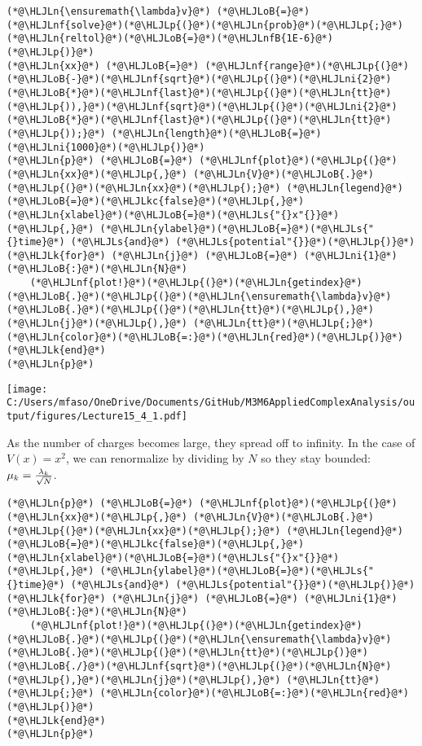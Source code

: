 \documentclass[12pt,landscape]{article}
\newcommand{\HLJLk}[1]{\textcolor[RGB]{148,91,176}{\textbf{#1}}}
\newcommand{\HLJLkc}[1]{\textcolor[RGB]{59,151,46}{\textit{#1}}}
\newcommand{\HLJLn}[1]{#1}
\newcommand{\HLJLnf}[1]{\textcolor[RGB]{66,102,213}{#1}}
\newcommand{\HLJLs}[1]{\textcolor[RGB]{201,61,57}{#1}}
\newcommand{\HLJLnfB}[1]{\textcolor[RGB]{59,151,46}{#1}}
\newcommand{\HLJLni}[1]{\textcolor[RGB]{59,151,46}{#1}}
\newcommand{\HLJLoB}[1]{\textcolor[RGB]{102,102,102}{\textbf{#1}}}
\newcommand{\HLJLp}[1]{#1}
\def\cent#1{\begin{center}#1\end{center} }
\begin{document}
{\begin{lstlisting}
(*@\HLJLn{\ensuremath{\lambda}v}@*) (*@\HLJLoB{=}@*) (*@\HLJLnf{solve}@*)(*@\HLJLp{(}@*)(*@\HLJLn{prob}@*)(*@\HLJLp{;}@*) (*@\HLJLn{reltol}@*)(*@\HLJLoB{=}@*)(*@\HLJLnfB{1E-6}@*)(*@\HLJLp{)}@*)
(*@\HLJLn{xx}@*) (*@\HLJLoB{=}@*) (*@\HLJLnf{range}@*)(*@\HLJLp{(}@*)(*@\HLJLoB{-}@*)(*@\HLJLnf{sqrt}@*)(*@\HLJLp{(}@*)(*@\HLJLni{2}@*)(*@\HLJLoB{*}@*)(*@\HLJLnf{last}@*)(*@\HLJLp{(}@*)(*@\HLJLn{tt}@*)(*@\HLJLp{)),}@*)(*@\HLJLnf{sqrt}@*)(*@\HLJLp{(}@*)(*@\HLJLni{2}@*)(*@\HLJLoB{*}@*)(*@\HLJLnf{last}@*)(*@\HLJLp{(}@*)(*@\HLJLn{tt}@*)(*@\HLJLp{));}@*) (*@\HLJLn{length}@*)(*@\HLJLoB{=}@*)(*@\HLJLni{1000}@*)(*@\HLJLp{)}@*)
(*@\HLJLn{p}@*) (*@\HLJLoB{=}@*) (*@\HLJLnf{plot}@*)(*@\HLJLp{(}@*)(*@\HLJLn{xx}@*)(*@\HLJLp{,}@*) (*@\HLJLn{V}@*)(*@\HLJLoB{.}@*)(*@\HLJLp{(}@*)(*@\HLJLn{xx}@*)(*@\HLJLp{);}@*) (*@\HLJLn{legend}@*)(*@\HLJLoB{=}@*)(*@\HLJLkc{false}@*)(*@\HLJLp{,}@*) (*@\HLJLn{xlabel}@*)(*@\HLJLoB{=}@*)(*@\HLJLs{"{}x"{}}@*)(*@\HLJLp{,}@*) (*@\HLJLn{ylabel}@*)(*@\HLJLoB{=}@*)(*@\HLJLs{"{}time}@*) (*@\HLJLs{and}@*) (*@\HLJLs{potential"{}}@*)(*@\HLJLp{)}@*)
(*@\HLJLk{for}@*) (*@\HLJLn{j}@*) (*@\HLJLoB{=}@*) (*@\HLJLni{1}@*)(*@\HLJLoB{:}@*)(*@\HLJLn{N}@*)
    (*@\HLJLnf{plot!}@*)(*@\HLJLp{(}@*)(*@\HLJLn{getindex}@*)(*@\HLJLoB{.}@*)(*@\HLJLp{(}@*)(*@\HLJLn{\ensuremath{\lambda}v}@*)(*@\HLJLoB{.}@*)(*@\HLJLp{(}@*)(*@\HLJLn{tt}@*)(*@\HLJLp{),}@*)(*@\HLJLn{j}@*)(*@\HLJLp{),}@*) (*@\HLJLn{tt}@*)(*@\HLJLp{;}@*) (*@\HLJLn{color}@*)(*@\HLJLoB{=:}@*)(*@\HLJLn{red}@*)(*@\HLJLp{)}@*)
(*@\HLJLk{end}@*)
(*@\HLJLn{p}@*)
\end{lstlisting}

\cent{\texttt{[image: C:/Users/mfaso/OneDrive/Documents/GitHub/M3M6AppliedComplexAnalysis/output/figures/Lecture15\_4\_1.pdf]}}

As the number of charges becomes large, they spread off to infinity. In the case of $V(x) = x^2$, we can renormalize by  dividing by $N$ so they stay bounded: $\mu_k = {\lambda_k \over \sqrt N}$.


\begin{lstlisting}
(*@\HLJLn{p}@*) (*@\HLJLoB{=}@*) (*@\HLJLnf{plot}@*)(*@\HLJLp{(}@*)(*@\HLJLn{xx}@*)(*@\HLJLp{,}@*) (*@\HLJLn{V}@*)(*@\HLJLoB{.}@*)(*@\HLJLp{(}@*)(*@\HLJLn{xx}@*)(*@\HLJLp{);}@*) (*@\HLJLn{legend}@*)(*@\HLJLoB{=}@*)(*@\HLJLkc{false}@*)(*@\HLJLp{,}@*) (*@\HLJLn{xlabel}@*)(*@\HLJLoB{=}@*)(*@\HLJLs{"{}x"{}}@*)(*@\HLJLp{,}@*) (*@\HLJLn{ylabel}@*)(*@\HLJLoB{=}@*)(*@\HLJLs{"{}time}@*) (*@\HLJLs{and}@*) (*@\HLJLs{potential"{}}@*)(*@\HLJLp{)}@*)
(*@\HLJLk{for}@*) (*@\HLJLn{j}@*) (*@\HLJLoB{=}@*) (*@\HLJLni{1}@*)(*@\HLJLoB{:}@*)(*@\HLJLn{N}@*)
    (*@\HLJLnf{plot!}@*)(*@\HLJLp{(}@*)(*@\HLJLn{getindex}@*)(*@\HLJLoB{.}@*)(*@\HLJLp{(}@*)(*@\HLJLn{\ensuremath{\lambda}v}@*)(*@\HLJLoB{.}@*)(*@\HLJLp{(}@*)(*@\HLJLn{tt}@*)(*@\HLJLp{)}@*)(*@\HLJLoB{./}@*)(*@\HLJLnf{sqrt}@*)(*@\HLJLp{(}@*)(*@\HLJLn{N}@*)(*@\HLJLp{),}@*)(*@\HLJLn{j}@*)(*@\HLJLp{),}@*) (*@\HLJLn{tt}@*)(*@\HLJLp{;}@*) (*@\HLJLn{color}@*)(*@\HLJLoB{=:}@*)(*@\HLJLn{red}@*)(*@\HLJLp{)}@*)
(*@\HLJLk{end}@*)
(*@\HLJLn{p}@*)
\end{lstlisting}

}
\end{document}
